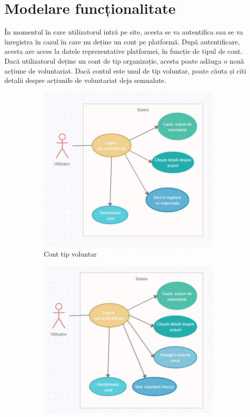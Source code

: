 \documentclass[12pt,a4paper]{report}
\begin{document}
\section{Modelare funcționalitate}
\par
În momentul în care utilizatorul intră pe site, acesta se va autentifica sau se va înregistra în cazul în care nu deține un cont pe platformă. După autentificare, acesta are acces la datele reprezentative platformei, în funcție de tipul de cont. Dacă utilizatorul deține un cont de tip organizație, acesta poate adăuga o nouă acțiune de voluntariat. Dacă contul este unul de tip voluntar, poate căuta și citi detalii despre acțiunile de voluntariat deja semnalate.
\\
\begin{figure}[h!]
  \centering
  \begin{subfigure}[b]{0.4\linewidth}
    \includegraphics[width=\linewidth]{UC_Voluntar.JPG}
    \caption{Cont tip voluntar}
  \end{subfigure}
  \begin{subfigure}[b]{0.42\linewidth}
    \includegraphics[width=\linewidth]{UC_Organizatie.JPG}

\end{subfigure}
\end{figure}
\end{document}
